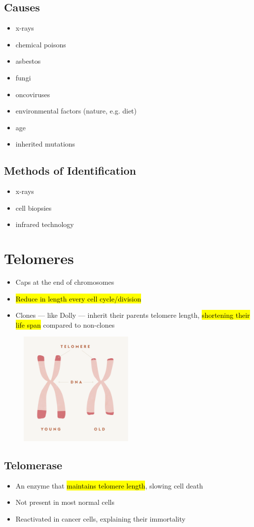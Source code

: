\documentclass[a4paper,12pt]{article}
\begin{document}
\subsection{Causes}
\begin{itemize}
    \item{x-rays}
    \item{chemical poisons}
    \item{asbestos}
    \item{fungi}
    \item{oncoviruses}
    \item{environmental factors (nature, e.g. diet)}
    \item{age}
    \item{inherited mutations}
\end{itemize}

\subsection{Methods of Identification}
\begin{itemize}
    \item{x-rays}
    \item{cell biopsies}
    \item{infrared technology}
\end{itemize}

\section{Telomeres}
\begin{itemize}
    \item{Caps at the end of chromosomes}
    \item{\hl{Reduce in length every cell cycle/division}}
    \item{Clones --- like Dolly --- inherit their parents telomere length, \hl{shortening their life span} compared to non-clones} 
\end{itemize}

\begin{figure}[H]
    \centering
    \includegraphics[width=0.50\textwidth]{telomere}
\end{figure}

\subsection{Telomerase}
\begin{itemize}
    \item{An enzyme that \hl{maintains telomere length}, slowing cell death}
    \item{Not present in most normal cells}
    \item{Reactivated in cancer cells, explaining their immortality}
\end{itemize}
\end{document}
